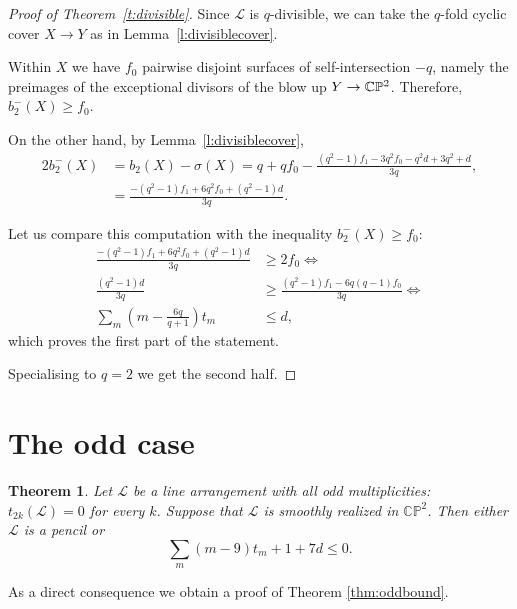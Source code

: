 \documentclass[a4paper,12pt, onesided]{amsart}
\newtheorem{thm}{Theorem}[section]
\newtheorem{cor}[thm]{Corollary}
\theoremstyle{remark}
\numberwithin{figure}{section}
\numberwithin{equation}{section}
\newcommand{\CP}{\mathbb{CP}\vphantom{\mathbb{P}}^2}
\renewcommand{\L}{\mathcal{L}}
\newcommand{\MG}[1]{\marginpar{\tiny\color{red}{\bf MG}: {#1}}}
\begin{document}
\begin{proof}[Proof of Theorem~\ref{t:divisible}]
Since $\L$ is $q$-divisible, we can take the $q$-fold cyclic cover $X\to Y$ as in Lemma~\ref{l:divisiblecover}.

Within $X$ we have $f_0$ pairwise disjoint surfaces of self-intersection $-q$, namely the preimages of the exceptional divisors of the blow up $Y \to \CP$.
Therefore, $b_2^-(X) \ge f_0$.

On the other hand, by Lemma~\ref{l:divisiblecover},
\begin{align*}
2b_2^-(X) &= b_2(X) - \sigma(X) = q + qf_0 - \frac{(q^2-1)f_1 - 3q^2f_0 - q^2d + 3q^2 + d}{3q},\\
& = \frac{- (q^2-1)f_1 + 6q^2 f_0 + (q^2-1)d}{3q}.
\end{align*}

Let us compare this computation with the inequality $b_2^-(X) \ge f_0$:
\begin{align*}
\frac{- (q^2-1)f_1 + 6q^2 f_0 + (q^2-1)d}{3q} &\ge 2f_0 \Longleftrightarrow \\
\frac{(q^2-1)d}{3q} &\ge \frac{(q^2-1)f_1 - 6q(q-1) f_0}{3q} \Longleftrightarrow\\
\sum_m (m-{\textstyle \frac{6q}{q+1}})t_m &\le d,
\end{align*}
which proves the first part of the statement.

Specialising to $q = 2$ we get the second half.
\end{proof}


\section{The odd case}\label{s:odd}

\begin{thm}\label{t:odd}
Let $\L$ be a line arrangement with all odd multiplicities: $t_{2k}(\L) = 0$ for every $k$. Suppose that $\L$ is smoothly realized in $\mathbb{CP}^2$. Then either $\L$ is a pencil or
\[
\sum_m (m-9)t_m + 1 + 7d \le 0.
\]
\end{thm}

As a direct consequence we obtain a proof of Theorem \ref{thm:oddbound}.
\end{document}
